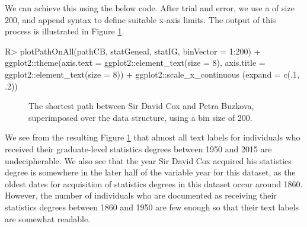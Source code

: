 \documentclass[article,shortnames]{jss}
\begin{document}
We can achieve this using the below code. After trial and error, we use a  of size 200, and append  syntax to define suitable x-axis limits. The output of this process is illustrated in Figure \ref{fig:plotCBText}.

\begin{CodeChunk}
\begin{CodeInput}
R> plotPathOnAll(pathCB, statGeneal, statIG, binVector = 1:200) +
   ggplot2::theme(axis.text = ggplot2::element_text(size = 8), axis.title =
   ggplot2::element_text(size = 8)) + ggplot2::scale_x_continuous
   (expand = c(.1, .2))
\end{CodeInput}
\end{CodeChunk}

\begin{figure}[H]
    \centering
    \caption{The shortest path between Sir David Cox and Petra Buzkova, superimposed over the data structure, using a bin size of 200.}
    \label{fig:plotCBText}
\end{figure}

We see from the resulting Figure \ref{fig:plotCBText} that almost all text labels for individuals who received their graduate-level statistics degrees between 1950 and 2015 are undecipherable. We also see that the year Sir David Cox acquired his statistics degree is somewhere in the later half of the variable year for this dataset, as the oldest dates for acquisition of statistics degrees in this dataset occur around 1860. However, the number of individuals who are documented as receiving their statistics degrees between 1860 and 1950 are few enough so that their text labels are somewhat readable.
\end{document}
